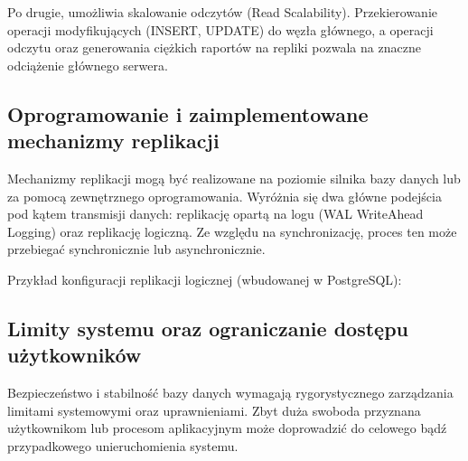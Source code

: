 \documentclass[a4paper,11pt,english,openany,oneside]{sphinxmanual}
\begin{document}
\sphinxAtStartPar
Po drugie, umożliwia skalowanie odczytów (Read Scalability). Przekierowanie operacji modyfikujących (INSERT, UPDATE) do węzła głównego, a operacji odczytu oraz generowania ciężkich raportów na repliki pozwala na znaczne odciążenie głównego serwera.


\subsection{Oprogramowanie i zaimplementowane mechanizmy replikacji}
\label{\detokenize{rozdzial_2/rozdzial_25/index:oprogramowanie-i-zaimplementowane-mechanizmy-replikacji}}
\sphinxAtStartPar
Mechanizmy replikacji mogą być realizowane na poziomie silnika bazy danych lub za pomocą zewnętrznego oprogramowania. Wyróżnia się dwa główne podejścia pod kątem transmisji danych: replikację opartą na logu (WAL \sphinxhyphen{} Write\sphinxhyphen{}Ahead Logging) oraz replikację logiczną. Ze względu na synchronizację, proces ten może przebiegać synchronicznie lub asynchronicznie.

\sphinxAtStartPar
Przykład konfiguracji replikacji logicznej (wbudowanej w PostgreSQL):

\begin{sphinxVerbatim}[commandchars=\\\{\}]

\end{sphinxVerbatim}


\subsection{Limity systemu oraz ograniczanie dostępu użytkowników}
\label{\detokenize{rozdzial_2/rozdzial_25/index:limity-systemu-oraz-ograniczanie-dostepu-uzytkownikow}}
\sphinxAtStartPar
Bezpieczeństwo i stabilność bazy danych wymagają rygorystycznego zarządzania limitami systemowymi oraz uprawnieniami. Zbyt duża swoboda przyznana użytkownikom lub procesom aplikacyjnym może doprowadzić do celowego bądź przypadkowego unieruchomienia systemu.
\end{document}
